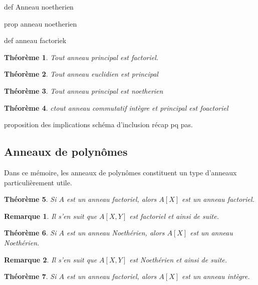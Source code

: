 \documentclass[a4paper,12pt]{report}  %
\theoremstyle{definitionstyle}
\theoremstyle{examplestyle}
\theoremstyle{remarkstyle}
\newtheorem{remark}{Remarque}[chapter] %
\theoremstyle{propositionstyle}
\theoremstyle{theoremstyle}
\newtheorem{theoreme}{Théorème}[chapter]  %
\theoremstyle{proofstyle}
\begin{document}
		

	def Anneau noetherien
	
	prop anneau noetherien
	
	
	def anneau factoriek
	
	\begin{theoreme}
		Tout anneau principal est factoriel.
	\end{theoreme}
	
	
	\begin{theoreme}
		Tout anneau euclidien est principal
	\end{theoreme}
	
	\begin{theoreme}
		Tout anneau principal est noetherien
	\end{theoreme}
	
	
	\begin{theoreme}
		ctout anneau commutatif intègre et principal est foactoriel
	\end{theoreme}
	
	
	

	
	
	proposition des implications
	schéma d'inclusion récap pq pas.
	
	\subsection{Anneaux de polynômes}
	
	Dans ce mémoire, les anneaux de polynômes constituent un type d'anneaux particulièrement utile.
	
	\begin{theoreme}
	Si $A$ est un anneau factoriel, alors $A[X]$ est un anneau factoriel.
	\end{theoreme}

	\begin{remark}
		Il s'en suit que $A[X, Y]$ est factoriel et ainsi de suite.
	\end{remark}

	\begin{theoreme}
		Si $A$ est un anneau Noethérien, alors $A[X]$ est un anneau Noethérien.
	\end{theoreme}
	
	\begin{remark}
		Il s'en suit que $A[X, Y]$ est Noethérien et ainsi de suite.
	\end{remark}

	\begin{theoreme}
		Si $A$ est un anneau factoriel, alors $A[X]$ est un anneau intègre.
	\end{theoreme}
	
\end{document}
